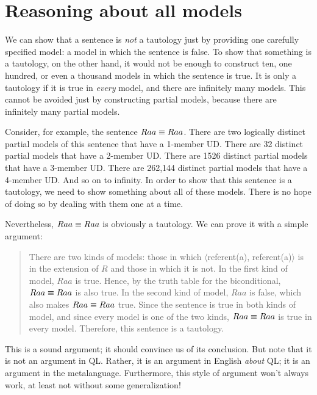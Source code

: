 \section{Reasoning about all models}
\label{sec.allmodelreasoning}
We can show that a sentence is \emph{not} a tautology just by providing one carefully specified model: a model in which the sentence is false. To show that something is a tautology, on the other hand, it would not be enough to construct ten, one hundred, or even a thousand models in which the sentence is true. It is only a tautology if it is true in \emph{every} model, and there are infinitely many models. This cannot be avoided just by constructing partial models, because there are infinitely many partial models.

Consider, for example, the sentence $Raa\equiv Raa$. There are two logically distinct partial models of this sentence that have a 1-member UD. There are 32 distinct partial models that have a 2-member UD. There are 1526 distinct partial models that have a 3-member UD. There are 262,144 distinct partial models that have a 4-member UD. And so on to infinity. In order to show that this sentence is a tautology, we need to show something about all of these models. There is no hope of doing so by dealing with them one at a time.

Nevertheless, $Raa\equiv Raa$ is obviously a tautology. We can prove it with a simple argument:
\begin{quote}
\label{allmodels1}
There are two kinds of models: those in which $\langle$referent(a), referent(a)$\rangle$ is in the extension of $R$ and those in which it is not. In the first kind of model, $Raa$ is true. Hence, by the truth table for the biconditional, $Raa\equiv Raa$ is also true. In the second kind of model, $Raa$ is false, which also makes $Raa\equiv Raa$ true. Since the sentence is true in both kinds of model, and since every model is one of the two kinds, $Raa\equiv Raa$ is true in every model. Therefore, this sentence is a tautology.
\end{quote}
This is a sound argument; it should convince us of its conclusion. But note that it is not an argument in QL. Rather, it is an argument in English \emph{about} QL; it is an argument in the metalanguage. Furthermore, this style of argument won't always work, at least not without some generalization! 

